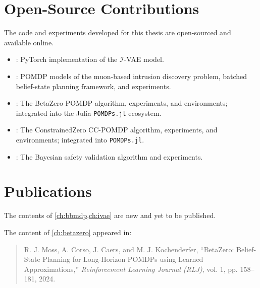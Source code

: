 \section{Open-Source Contributions}
The code and experiments developed for this thesis are open-sourced and available online.

\begin{itemize}
    \item {}: PyTorch implementation of the $\mathcal{I}$-VAE model.
    \item {}: POMDP models of the muon-based intrusion discovery problem, batched belief-state planning framework, and experiments.
    \item {}: The BetaZero POMDP algorithm, experiments, and environments; integrated into the Julia \texttt{POMDPs.jl} ecosystem.
    \item {}: The ConstrainedZero CC-POMDP algorithm, experiments, and environments; integrated into \texttt{POMDPs.jl}.
    \item {}: The Bayesian safety validation algorithm and experiments.
\end{itemize}

\section{Publications}

\noindent The contents of \cref{ch:bbmdp,ch:ivae} are new and yet to be published.

\phantom{---}

\noindent The content of \cref{ch:betazero} appeared in:
\begin{quote}
    \cite{moss2024betazero} R. J. Moss, A. Corso, J. Caers, and M. J. Kochenderfer, ``BetaZero: Belief-State Planning for Long-Horizon POMDPs using Learned Approximations,'' \textit{Reinforcement Learning Journal (RLJ)}, vol. 1, pp. 158--181, 2024.\\
\end{quote}

\phantom{---}

